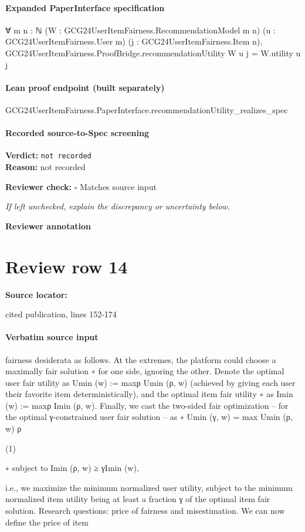 \documentclass[10pt]{article}
\newcommand{\reviewerbox}{%
  \par\noindent\fbox{\parbox{0.96\linewidth}{\rule{0pt}{0.38in}}}\par
}
\newcommand{\reviewmatch}[1]{%
  \par\noindent\textbf{Reviewer check:} $\square$\; #1\par
  \noindent\emph{If left unchecked, explain the discrepancy or uncertainty below.}\par
}
\begin{document}
\paragraph{Expanded PaperInterface specification}
\begin{ReviewVerbatim}
∀ {m n : ℕ} (W : GCG24UserItemFairness.RecommendationModel m n) (u : GCG24UserItemFairness.User m)
  (j : GCG24UserItemFairness.Item n), GCG24UserItemFairness.ProofBridge.recommendationUtility W u j = W.utility u j
\end{ReviewVerbatim}

\paragraph{Lean proof endpoint (built separately)}\begin{ReviewVerbatim}
GCG24UserItemFairness.PaperInterface.recommendationUtility_realizes_spec
\end{ReviewVerbatim}

\paragraph{Recorded source-to-Spec screening}
\textbf{Verdict:} \texttt{not recorded}
\\
\textbf{Reason:} not recorded
\reviewmatch{Matches source input}
\noindent\textbf{Reviewer annotation}\par
\reviewerbox
\clearpage
\hypertarget{source-claim-0b16a4458c32b7d8}{}
\section*{Review row 14}
\textbf{Source locator:} {\footnotesize\raggedright cited publication, lines 152-\allowbreak{}174\par}
\paragraph{Verbatim source input}
\begin{ReviewVerbatim}
fairness desiderata as follows. At the extremes, the platform could choose a maximally fair solution
∗
for one side, ignoring the other. Denote the optimal user fair utility as Umin
(w) := maxρ Umin (ρ, w)
(achieved by giving each user their favorite item deterministically), and the optimal item fair utility
∗
as Imin
(w) := maxρ Imin (ρ, w).
Finally, we cast the two-sided fair optimization – for the optimal γ-constrained user fair solution – as
∗
Umin
(γ, w) = max Umin (ρ, w)
ρ

(1)

∗
subject to Imin (ρ, w) ≥ γImin
(w),

i.e., we maximize the minimum normalized user utility, subject to the minimum normalized item
utility being at least a fraction γ of the optimal item fair solution.
Research questions: price of fairness and misestimation. We can now define the price of item
\end{ReviewVerbatim}
\end{document}
